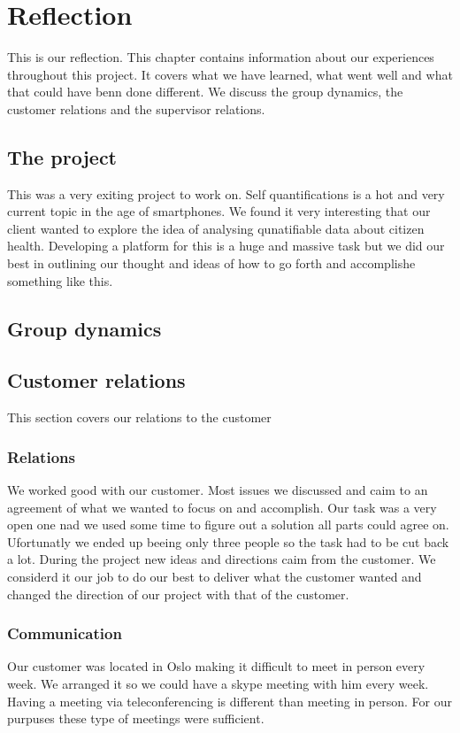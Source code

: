 \chapter{Reflection} 
\label{ch:reflection}


 This is our reflection. 
 This chapter contains information about our experiences throughout this project. 
 It covers what we have learned, what went well and what that could have benn done different. 
 We discuss the group dynamics, the customer relations and the supervisor relations.
 

\section{The project}
This was a very exiting project to work on. 
Self quantifications is a hot and very current topic in the age of smartphones.
We found it very interesting that our client wanted to explore the idea of analysing qunatifiable data about citizen health.
Developing a platform for this is a huge and massive task but we did our best in outlining our thought and ideas of how to go forth and accomplishe something like this.

\section{Group dynamics}
 
 
\section{Customer relations}
This section covers our relations to the customer
\subsection{Relations}
We worked good with our customer.
Most issues we discussed and caim to an agreement of what we wanted to focus on and accomplish.
Our task was a very open one nad we used some time to figure out a solution all parts could agree on. Ufortunatly we ended up beeing only three people so the task had to be cut back a lot. 
During the project new ideas and directions caim from the customer.
We considerd it our job to do our best to deliver what the customer wanted and changed the direction of our project with that of the customer.
\subsection{Communication}
Our customer was located in Oslo making it difficult to meet in person every week.
We arranged it so we could have a skype meeting with him every week.
Having a meeting via teleconferencing is different than meeting in person.
For our purpuses these type of meetings were sufficient. 

